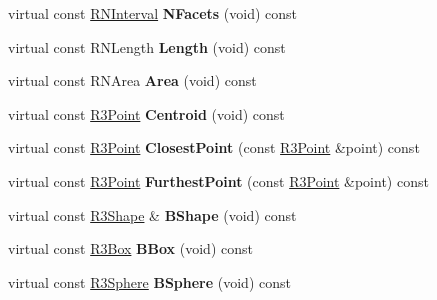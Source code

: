 \begin{DoxyCompactItemize}
\item 
virtual const \hyperlink{class_r_n_interval}{R\+N\+Interval} {\bfseries N\+Facets} (void) const \hypertarget{class_r3_triangle_a13197ef5dd97d23f2a6c14ad9bb571a8}{}\label{class_r3_triangle_a13197ef5dd97d23f2a6c14ad9bb571a8}

\item 
virtual const R\+N\+Length {\bfseries Length} (void) const \hypertarget{class_r3_triangle_a763d740dcab38dfd40ae76ae6c1c678f}{}\label{class_r3_triangle_a763d740dcab38dfd40ae76ae6c1c678f}

\item 
virtual const R\+N\+Area {\bfseries Area} (void) const \hypertarget{class_r3_triangle_ac7664ca6459ddecd58a5127939798993}{}\label{class_r3_triangle_ac7664ca6459ddecd58a5127939798993}

\item 
virtual const \hyperlink{class_r3_point}{R3\+Point} {\bfseries Centroid} (void) const \hypertarget{class_r3_triangle_a91c652c6c2446bfe8350d06f8199d355}{}\label{class_r3_triangle_a91c652c6c2446bfe8350d06f8199d355}

\item 
virtual const \hyperlink{class_r3_point}{R3\+Point} {\bfseries Closest\+Point} (const \hyperlink{class_r3_point}{R3\+Point} \&point) const \hypertarget{class_r3_triangle_a671124bdb54f9075ec6c4f932898a048}{}\label{class_r3_triangle_a671124bdb54f9075ec6c4f932898a048}

\item 
virtual const \hyperlink{class_r3_point}{R3\+Point} {\bfseries Furthest\+Point} (const \hyperlink{class_r3_point}{R3\+Point} \&point) const \hypertarget{class_r3_triangle_a364ded2e250548137a968d733df55641}{}\label{class_r3_triangle_a364ded2e250548137a968d733df55641}

\item 
virtual const \hyperlink{class_r3_shape}{R3\+Shape} \& {\bfseries B\+Shape} (void) const \hypertarget{class_r3_triangle_a3c0a4431ba6aae2d8af376f42379d889}{}\label{class_r3_triangle_a3c0a4431ba6aae2d8af376f42379d889}

\item 
virtual const \hyperlink{class_r3_box}{R3\+Box} {\bfseries B\+Box} (void) const \hypertarget{class_r3_triangle_a8c91bbfd58fb27f049e7476332ff3431}{}\label{class_r3_triangle_a8c91bbfd58fb27f049e7476332ff3431}

\item 
virtual const \hyperlink{class_r3_sphere}{R3\+Sphere} {\bfseries B\+Sphere} (void) const \hypertarget{class_r3_triangle_a0f82b8786cb875fc2d428a849ed18a23}{}\label{class_r3_triangle_a0f82b8786cb875fc2d428a849ed18a23}


\end{DoxyCompactItemize}
